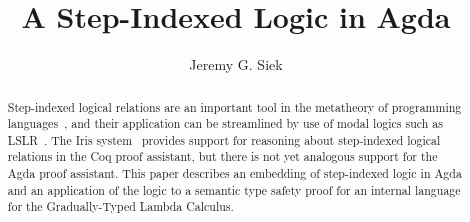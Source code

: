 \documentclass[acmsmall]{acmart}
\begin{document}
\title{A Step-Indexed Logic in Agda}

\author{Jeremy G. Siek}



\begin{abstract}
  Step-indexed logical relations are an important tool in the
  metatheory of programming
  languages~\citep{Appel:2001aa,Ahmed:2006aa}, and their application
  can be streamlined by use of modal logics such as
  LSLR~\citep{Dreyer:2011wl}.  The Iris system~\citep{JUNG:2018aa}
  provides support for reasoning about step-indexed logical relations
  in the Coq proof assistant, but there is not yet analogous support
  for the Agda proof assistant. This paper describes an embedding of
  step-indexed logic in Agda and an application of the logic to a
  semantic type safety proof for an internal language for the
  Gradually-Typed Lambda Calculus.
\end{abstract}

\end{document}
